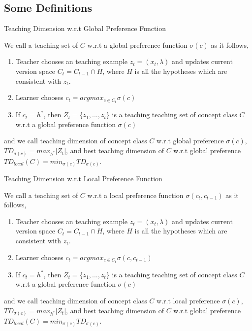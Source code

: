 \documentclass{beamer}
\begin{document}
\subsection{Some Definitions}
\begin{frame}{Teaching Dimension w.r.t Global Preference Function}
    

We call a teaching set of $C$ w.r.t a global preference function $\sigma(c)$ as it follows,
\begin{enumerate}
\item Teacher chooses an teaching example $z_t = (x_t, \lambda)$ and updates current version space $C_t = C_{t-1} \cap H$, where $H$ is all the hypotheses which are consistent with $z_t$.
\item Learner chooses $c_t = argmax_{c \in C_t } \sigma(c)$
\item If $c_t = h^*$, then $Z_t = \{z_1, ..., z_t\}$ is a teaching teaching set of concept class $C$ w.r.t a global preference function $\sigma(c)$
\end{enumerate}
and we call teaching dimension of concept class $C$ w.r.t global preference $\sigma(c)$, $TD_{\sigma(c)} = max_{h^*} |Z_t|$, and  best teaching dimension of $C$ w.r.t global preference $TD_{local}(C) = min_{\sigma(c)} TD_{\sigma(c)} $.
\end{frame}

\begin{frame}{Teaching Dimension w.r.t Local Preference Function}

We call a teaching set of $C$ w.r.t a local preference function $\sigma(c_t, c_{t-1})$ as it follows,
\begin{enumerate}
\item Teacher chooses an teaching example $z_t = (x_t, \lambda)$ and updates current version space $C_t = C_{t-1} \cap H$, where $H$ is all the hypotheses which are consistent with $z_t$.
\item Learner chooses $c_t = argmax_{c \in C_t } \sigma(c, c_{t-1})$
\item If $c_t = h^*$, then $Z_t = \{z_1, ..., z_t\}$ is a teaching teaching set of concept class $C$ w.r.t a global preference function $\sigma(c)$
\end{enumerate}
and we call teaching dimension of concept class $C$ w.r.t local preference $\sigma(c)$, $TD_{\sigma(c)} = max_{h^*} |Z_t|$, and  best teaching dimension of $C$ w.r.t global preference $TD_{local}(C) = min_{\sigma(c)} TD_{\sigma(c)} $.

\end{frame}
\end{document}
